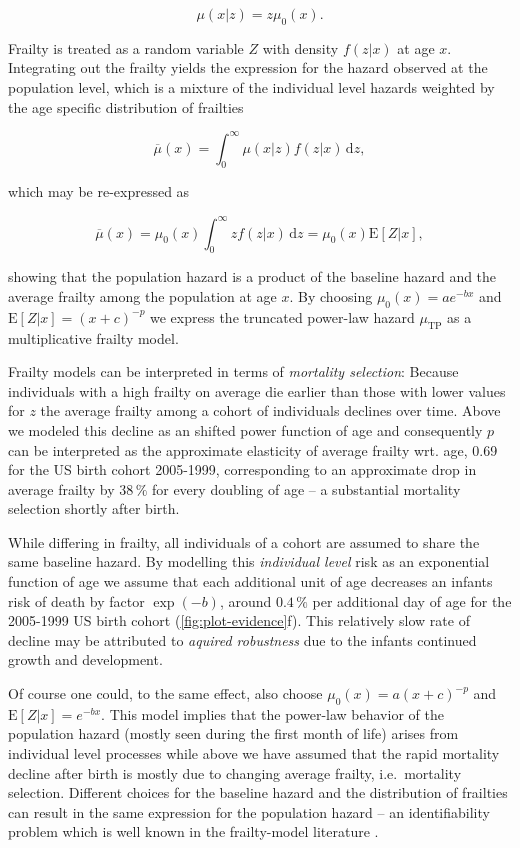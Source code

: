 \documentclass[smallextended]{svjour3} %
\begin{document}
\[
\mu(x|z) = z\mu_0(x).
\]

Frailty is treated as a random variable \(Z\) with density \(f(z|x)\) at
age \(x\). Integrating out the frailty yields the expression for the
hazard observed at the population level, which is a mixture of the
individual level hazards weighted by the age specific distribution of
frailties

\[
\overline{\mu}(x) = \int_0^\infty \mu(x|z)f(z|x)\,\text{d}z,
\]

which may be re-expressed as

\[
\overline{\mu}(x) = \mu_0(x)\int_0^\infty zf(z|x)\,\text{d}z = \mu_0(x)\text{E}[Z|x],
\]

showing that the population hazard is a product of the baseline hazard
and the average frailty among the population at age \(x\). By choosing
\(\mu_0(x)=ae^{-bx}\) and \(\text{E}[Z|x]=(x+c)^{-p}\) we express the
truncated power-law hazard \(\mu_\text{TP}\) as a multiplicative frailty
model.

Frailty models can be interpreted in terms of \emph{mortality
selection}: Because individuals with a high frailty on average die
earlier than those with lower values for \(z\) the average frailty among
a cohort of individuals declines over time. Above we modeled this
decline as an shifted power function of age and consequently \(p\) can
be interpreted as the approximate elasticity of average frailty wrt.
age, 0.69 for the US birth cohort 2005-1999, corresponding to an
approximate drop in average frailty by \(38\,\%\) for every doubling of
age -- a substantial mortality selection shortly after birth.

While differing in frailty, all individuals of a cohort are assumed to
share the same baseline hazard. By modelling this \emph{individual
level} risk as an exponential function of age we assume that each
additional unit of age decreases an infants risk of death by factor
\(\exp(-b)\), around \(0.4\,\%\) per additional day of age for the
2005-1999 US birth cohort (\ref{fig:plot-evidence}f). This relatively
slow rate of decline may be attributed to \emph{aquired robustness} due
to the infants continued growth and development.

Of course one could, to the same effect, also choose
\(\mu_0(x)=a(x+c)^{-p}\) and \(\text{E}[Z|x]=e^{-bx}\). This model
implies that the power-law behavior of the population hazard (mostly
seen during the first month of life) arises from individual level
processes while above we have assumed that the rapid mortality decline
after birth is mostly due to changing average frailty, i.e.~mortality
selection. Different choices for the baseline hazard and the
distribution of frailties can result in the same expression for the
population hazard -- an identifiability problem which is well known in
the frailty-model literature \citep[e.g.][]{Hougaard1995}.
\end{document}
